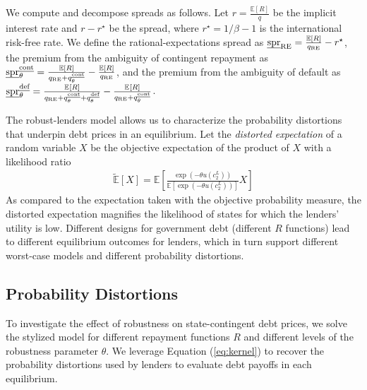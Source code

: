 We compute and decompose spreads as follows. Let $r = \frac{\mathbb{E}[R]}{q}$ be the implicit interest rate and $r-r^\star$ be the spread, where $r^\star = 1/\beta - 1$ is the international risk-free rate. We define the rational-expectations spread as $\text{\emph{spr}}_\text{RE} = \frac{\mathbb{E}[R]}{q_\text{RE}} - r^\star$, the premium from the ambiguity of contingent repayment as $\text{\emph{spr}}_\theta^\text{\emph{cont}} = \frac{\mathbb{E}[R]}{q_\text{RE} + q_\theta^\text{\emph{cont}}} - \frac{\mathbb{E}[R]}{q_\text{RE}}$, and the premium from the ambiguity of default as $\text{\emph{spr}}_\theta^\text{\emph{def}} = \frac{\mathbb{E}_{{}}\left[ R \right]}{q_\text{RE}+q_\theta^\text{\emph{cont}}+q_\theta^\text{\emph{def}}} - \frac{\mathbb{E}_{{}}\left[ R \right]}{q_\text{RE}+q_\theta^\text{\emph{cont}}}$.

The robust-lenders model allows us to characterize the probability distortions that underpin debt prices in an equilibrium. Let the \emph{distorted expectation} of a random variable $X$ be the objective expectation of the product of $X$ with a likelihood ratio
\begin{align}\label{eq:kernel}
  \tilde{\mathbb{E}}\left[X\right] = \mathbb{E}\left[\frac{\exp(-\theta u(c_2^L))}{\mathbb{E}\left[\exp(-\theta u(c_2^L))\right]} X \right]
\end{align}
As compared to the expectation taken with the objective probability measure, the distorted expectation magnifies the likelihood of states for which the lenders' utility is low. Different designs for government debt (different $R$ functions) lead to different equilibrium outcomes for lenders, which in turn support different worst-case models and different probability distortions.

\subsection{Probability Distortions}
To investigate the effect of robustness on state-contingent debt prices, we solve the stylized model for different repayment functions $R$ and different levels of the robustness parameter $\theta$. We leverage Equation (\ref{eq:kernel}) to recover the probability distortions used by lenders to evaluate debt payoffs in each equilibrium.

